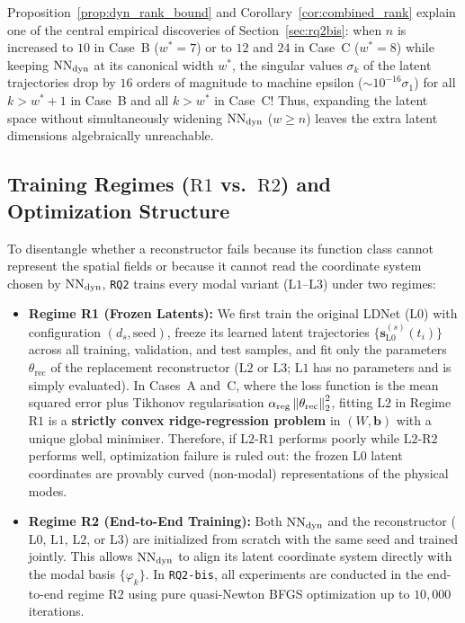 Proposition~\ref{prop:dyn_rank_bound} and Corollary~\ref{cor:combined_rank} explain one of the central empirical discoveries of Section~\ref{sec:rq2bis}: when $n$ is increased to $10$ in Case~B ($w^*=7$) or to $12$ and $24$ in Case~C ($w^*=8$) while keeping $\mathrm{NN}_{\mathrm{dyn}}$ at its canonical width $w^*$, the singular values $\sigma_k$ of the latent trajectories drop by $16$ orders of magnitude to machine epsilon ($\sim 10^{-16}\sigma_1$) for all $k > w^* + 1$ in Case~B and all $k > w^*$ in Case~C! Thus, expanding the latent space without simultaneously widening $\mathrm{NN}_{\mathrm{dyn}}$ ($w \ge n$) leaves the extra latent dimensions algebraically unreachable.

\subsection{Training Regimes (\texorpdfstring{$\mathrm{R1}$}{R1} vs.\ \texorpdfstring{$\mathrm{R2}$}{R2}) and Optimization Structure}

To disentangle whether a reconstructor fails because its function class cannot represent the spatial fields or because it cannot read the coordinate system chosen by $\mathrm{NN}_{\mathrm{dyn}}$, \texttt{RQ2} trains every modal variant ($\mathrm{L1}$--$\mathrm{L3}$) under two regimes:
\begin{itemize}[leftmargin=2em]
  \item \textbf{Regime R1 (Frozen Latents):} We first train the original LDNet ($\mathrm{L0}$) with configuration $(d_s, \text{seed})$, freeze its learned latent trajectories $\{\mathbf{s}_{\mathrm{L0}}^{(s)}(t_i)\}$ across all training, validation, and test samples, and fit only the parameters $\theta_{\mathrm{rec}}$ of the replacement reconstructor ($\mathrm{L2}$ or $\mathrm{L3}$; $\mathrm{L1}$ has no parameters and is simply evaluated). In Cases~A and~C, where the loss function is the mean squared error plus Tikhonov regularisation $\alpha_{\mathrm{reg}}\left\lVert \theta_{\mathrm{rec}} \right\rVert_2^2$, fitting $\mathrm{L2}$ in Regime~$\mathrm{R1}$ is a \textbf{strictly convex ridge-regression problem} in $(W,\mathbf{b})$ with a unique global minimiser. Therefore, if $\mathrm{L2}$-$\mathrm{R1}$ performs poorly while $\mathrm{L2}$-$\mathrm{R2}$ performs well, optimization failure is ruled out: the frozen $\mathrm{L0}$ latent coordinates are provably curved (non-modal) representations of the physical modes.
  \item \textbf{Regime R2 (End-to-End Training):} Both $\mathrm{NN}_{\mathrm{dyn}}$ and the reconstructor ($\mathrm{L0}$, $\mathrm{L1}$, $\mathrm{L2}$, or $\mathrm{L3}$) are initialized from scratch with the same seed and trained jointly. This allows $\mathrm{NN}_{\mathrm{dyn}}$ to align its latent coordinate system directly with the modal basis $\{\varphi_k\}$. In \texttt{RQ2-bis}, all experiments are conducted in the end-to-end regime $\mathrm{R2}$ using pure quasi-Newton BFGS optimization up to $10{,}000$ iterations.
\end{itemize}
